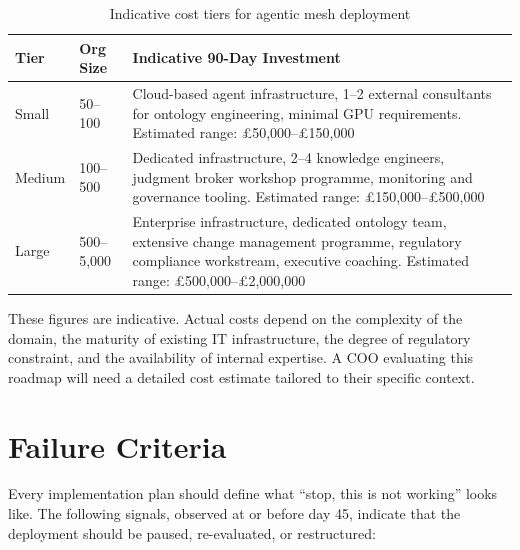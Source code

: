 \begin{table}[h]
\centering
\caption{Indicative cost tiers for agentic mesh deployment}
\label{tab:cost-tiers}
\begin{tabularx}{\textwidth}{l C{2.5cm} X}
\toprule
\textbf{Tier} & \textbf{Org Size} & \textbf{Indicative 90-Day Investment} \\
\midrule
Small & 50--100 & Cloud-based agent infrastructure, 1--2 external consultants for ontology engineering, minimal GPU requirements. Estimated range: \pounds50,000--\pounds150,000 \\
\addlinespace
Medium & 100--500 & Dedicated infrastructure, 2--4 knowledge engineers, judgment broker workshop programme, monitoring and governance tooling. Estimated range: \pounds150,000--\pounds500,000 \\
\addlinespace
Large & 500--5,000 & Enterprise infrastructure, dedicated ontology team, extensive change management programme, regulatory compliance workstream, executive coaching. Estimated range: \pounds500,000--\pounds2,000,000 \\
\bottomrule
\end{tabularx}
\end{table}

These figures are indicative. Actual costs depend on the complexity of the domain, the maturity of existing IT infrastructure, the degree of regulatory constraint, and the availability of internal expertise. A COO evaluating this roadmap will need a detailed cost estimate tailored to their specific context.

\section{Failure Criteria}

Every implementation plan should define what ``stop, this is not working'' looks like. The following signals, observed at or before day 45, indicate that the deployment should be paused, re-evaluated, or restructured:

